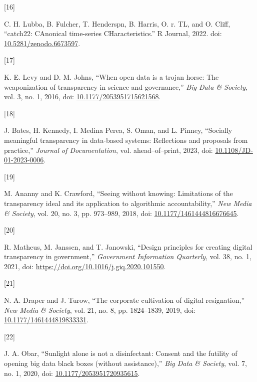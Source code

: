 \documentclass{article}
\newlength{\cslhangindent}
\newlength{\csllabelwidth}
\newlength{\cslentryspacingunit} %
\newenvironment{CSLReferences}[2] %
 {%
  \setlength{\parindent}{0pt}
  \ifodd #1
  \let\oldpar\par
  \def\par{\hangindent=\cslhangindent\oldpar}
  \fi
  \setlength{\parskip}{#2\cslentryspacingunit}
 }%
 {}
\newcommand{\CSLLeftMargin}[1]{\parbox[t]{\csllabelwidth}{#1}}
\newcommand{\CSLRightInline}[1]{\parbox[t]{\linewidth - \csllabelwidth}{#1}\break}
\begin{document}
\begin{CSLReferences}{0}{0}
\leavevmode{}%
\CSLLeftMargin{{[}16{]} }
\CSLRightInline{C. H. Lubba, B. Fulcher, T. Henderspn, B. Harris, O. r.
TL, and O. Cliff, {``catch22: CAnonical time-series CHaracteristics.''}
R Journal, 2022. doi:
\href{https://doi.org/10.5281/zenodo.6673597}{10.5281/zenodo.6673597}.}

\leavevmode{}%
\CSLLeftMargin{{[}17{]} }
\CSLRightInline{K. E. Levy and D. M. Johns, {``When open data is a
trojan horse: The weaponization of transparency in science and
governance,''} \emph{Big Data \& Society}, vol. 3, no. 1, 2016, doi:
\href{https://doi.org/10.1177/2053951715621568}{10.1177/2053951715621568}.}

\leavevmode{}%
\CSLLeftMargin{{[}18{]} }
\CSLRightInline{J. Bates, H. Kennedy, I. Medina Perea, S. Oman, and L.
Pinney, {``Socially meaningful transparency in data-based systems:
Reflections and proposals from practice,''} \emph{Journal of
Documentation}, vol. ahead--of--print, 2023, doi:
\href{https://doi.org/10.1108/JD-01-2023-0006}{10.1108/JD-01-2023-0006}.}

\leavevmode{}%
\CSLLeftMargin{{[}19{]} }
\CSLRightInline{M. Ananny and K. Crawford, {``Seeing without knowing:
Limitations of the transparency ideal and its application to algorithmic
accountability,''} \emph{New Media \& Society}, vol. 20, no. 3, pp.
973--989, 2018, doi:
\href{https://doi.org/10.1177/1461444816676645}{10.1177/1461444816676645}.}

\leavevmode{}%
\CSLLeftMargin{{[}20{]} }
\CSLRightInline{R. Matheus, M. Janssen, and T. Janowski, {``Design
principles for creating digital transparency in government,''}
\emph{Government Information Quarterly}, vol. 38, no. 1, 2021, doi:
\url{https://doi.org/10.1016/j.giq.2020.101550}.}

\leavevmode{}%
\CSLLeftMargin{{[}21{]} }
\CSLRightInline{N. A. Draper and J. Turow, {``The corporate cultivation
of digital resignation,''} \emph{New Media \& Society}, vol. 21, no. 8,
pp. 1824--1839, 2019, doi:
\href{https://doi.org/10.1177/1461444819833331}{10.1177/1461444819833331}.}

\leavevmode{}%
\CSLLeftMargin{{[}22{]} }
\CSLRightInline{J. A. Obar, {``Sunlight alone is not a disinfectant:
Consent and the futility of opening big data black boxes (without
assistance),''} \emph{Big Data \& Society}, vol. 7, no. 1, 2020, doi:
\href{https://doi.org/10.1177/2053951720935615}{10.1177/2053951720935615}.}


\end{CSLReferences}
\end{document}
